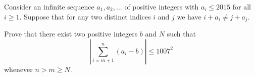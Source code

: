 Consider an infinite sequence $a_1, a_2, \ldots$ of positive integers with $a_i \leq 2015$ for all $i \geq 1$. Suppose that for any two distinct indices $i$ and $j$ we have $i + a_i \neq j + a_j$.

Prove that there exist two positive integers $b$ and $N$ such that
\[ \left| \sum_{i=m+1}^{n} (a_i - b) \right| \leq 1007^2 \]
whenever $n > m \geq N$.
